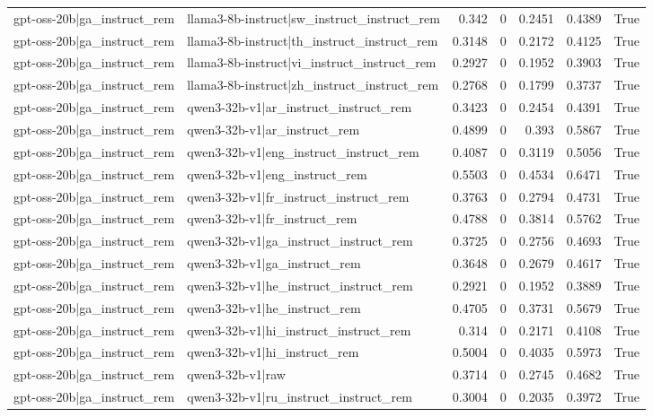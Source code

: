 \begin{table}
\begin{tabular}{l l r r r r l}
gpt-oss-20b|ga_instruct_rem & llama3-8b-instruct|sw_instruct_instruct_rem & 0.342 & 0 & 0.2451 & 0.4389 & True \\
gpt-oss-20b|ga_instruct_rem & llama3-8b-instruct|th_instruct_instruct_rem & 0.3148 & 0 & 0.2172 & 0.4125 & True \\
gpt-oss-20b|ga_instruct_rem & llama3-8b-instruct|vi_instruct_instruct_rem & 0.2927 & 0 & 0.1952 & 0.3903 & True \\
gpt-oss-20b|ga_instruct_rem & llama3-8b-instruct|zh_instruct_instruct_rem & 0.2768 & 0 & 0.1799 & 0.3737 & True \\
gpt-oss-20b|ga_instruct_rem & qwen3-32b-v1|ar_instruct_instruct_rem & 0.3423 & 0 & 0.2454 & 0.4391 & True \\
gpt-oss-20b|ga_instruct_rem & qwen3-32b-v1|ar_instruct_rem & 0.4899 & 0 & 0.393 & 0.5867 & True \\
gpt-oss-20b|ga_instruct_rem & qwen3-32b-v1|eng_instruct_instruct_rem & 0.4087 & 0 & 0.3119 & 0.5056 & True \\
gpt-oss-20b|ga_instruct_rem & qwen3-32b-v1|eng_instruct_rem & 0.5503 & 0 & 0.4534 & 0.6471 & True \\
gpt-oss-20b|ga_instruct_rem & qwen3-32b-v1|fr_instruct_instruct_rem & 0.3763 & 0 & 0.2794 & 0.4731 & True \\
gpt-oss-20b|ga_instruct_rem & qwen3-32b-v1|fr_instruct_rem & 0.4788 & 0 & 0.3814 & 0.5762 & True \\
gpt-oss-20b|ga_instruct_rem & qwen3-32b-v1|ga_instruct_instruct_rem & 0.3725 & 0 & 0.2756 & 0.4693 & True \\
gpt-oss-20b|ga_instruct_rem & qwen3-32b-v1|ga_instruct_rem & 0.3648 & 0 & 0.2679 & 0.4617 & True \\
gpt-oss-20b|ga_instruct_rem & qwen3-32b-v1|he_instruct_instruct_rem & 0.2921 & 0 & 0.1952 & 0.3889 & True \\
gpt-oss-20b|ga_instruct_rem & qwen3-32b-v1|he_instruct_rem & 0.4705 & 0 & 0.3731 & 0.5679 & True \\
gpt-oss-20b|ga_instruct_rem & qwen3-32b-v1|hi_instruct_instruct_rem & 0.314 & 0 & 0.2171 & 0.4108 & True \\
gpt-oss-20b|ga_instruct_rem & qwen3-32b-v1|hi_instruct_rem & 0.5004 & 0 & 0.4035 & 0.5973 & True \\
gpt-oss-20b|ga_instruct_rem & qwen3-32b-v1|raw & 0.3714 & 0 & 0.2745 & 0.4682 & True \\
gpt-oss-20b|ga_instruct_rem & qwen3-32b-v1|ru_instruct_instruct_rem & 0.3004 & 0 & 0.2035 & 0.3972 & True \\

\end{tabular}
\end{table}
